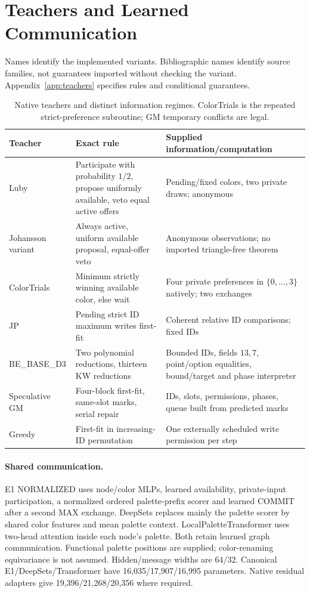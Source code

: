 \documentclass[10pt]{article}
\begin{document}
\section{Teachers and Learned Communication}
\label{sec:teachers}
Names identify the implemented variants. Bibliographic names identify source
families, not guarantees imported without checking the variant.
Appendix~\ref{app:teachers} specifies rules and conditional guarantees.
\begin{table}[htbp]\centering\small
\begin{tabular}{p{.16\linewidth}p{.40\linewidth}p{.35\linewidth}}
\toprule Teacher & Exact rule & Supplied information/computation \\
\midrule
Luby & Participate with probability $1/2$, propose uniformly available,
veto equal active offers & Pending/fixed colors, two private draws; anonymous \\
Johansson variant & Always active, uniform available proposal, equal-offer
veto & Anonymous observations; no imported triangle-free theorem \\
ColorTrials & Minimum strictly winning available color, else wait & Four
private preferences in $\{0,\ldots,3\}$ natively; two exchanges \\
JP & Pending strict ID maximum writes first-fit & Coherent relative ID
comparisons; fixed IDs \\
BE\_BASE\_D3 & Two polynomial reductions, thirteen KW reductions & Bounded
IDs, fields $13,7$, point/option equalities, bound/target and phase interpreter \\
Speculative GM & Four-block first-fit, same-slot marks, serial repair & IDs,
slots, permissions, phases, queue built from predicted marks \\
Greedy & First-fit in increasing-ID permutation & One externally scheduled
write permission per step \\
\bottomrule
\end{tabular}
\caption{Native teachers and distinct information regimes. ColorTrials is
the repeated strict-preference subroutine; GM temporary conflicts are legal.}
\label{tab:teachers}
\end{table}

\paragraph{Shared communication.}
E1 NORMALIZED uses node/color MLPs, learned availability, private-input
participation, a normalized ordered palette-prefix scorer and learned COMMIT
after a second MAX exchange. DeepSets replaces mainly the palette scorer by
shared color features and mean palette context. LocalPaletteTransformer uses
two-head attention inside each node's palette. Both retain learned graph
communication. Functional palette positions are supplied; color-renaming
equivariance is not assumed. Hidden/message widths are $64/32$. Canonical
E1/DeepSets/Transformer have 16,035/17,907/16,995 parameters. Native residual
adapters give 19,396/21,268/20,356 where required.
\end{document}
